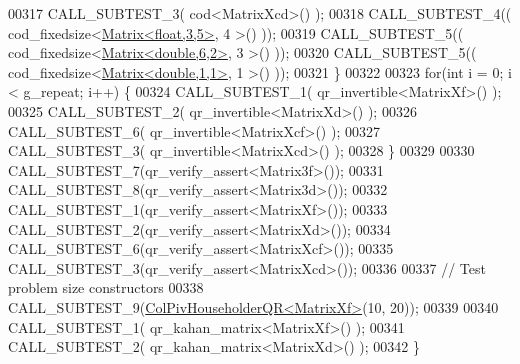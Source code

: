 \begin{DoxyCode}
00317     CALL\_SUBTEST\_3( cod<MatrixXcd>() );
00318     CALL\_SUBTEST\_4(( cod\_fixedsize<\hyperlink{group___core___module_class_eigen_1_1_matrix}{Matrix<float,3,5>}, 4 >() ));
00319     CALL\_SUBTEST\_5(( cod\_fixedsize<\hyperlink{group___core___module_class_eigen_1_1_matrix}{Matrix<double,6,2>}, 3 >() ));
00320     CALL\_SUBTEST\_5(( cod\_fixedsize<\hyperlink{group___core___module_class_eigen_1_1_matrix}{Matrix<double,1,1>}, 1 >() ));
00321   \}
00322 
00323   \textcolor{keywordflow}{for}(\textcolor{keywordtype}{int} i = 0; i < g\_repeat; i++) \{
00324     CALL\_SUBTEST\_1( qr\_invertible<MatrixXf>() );
00325     CALL\_SUBTEST\_2( qr\_invertible<MatrixXd>() );
00326     CALL\_SUBTEST\_6( qr\_invertible<MatrixXcf>() );
00327     CALL\_SUBTEST\_3( qr\_invertible<MatrixXcd>() );
00328   \}
00329 
00330   CALL\_SUBTEST\_7(qr\_verify\_assert<Matrix3f>());
00331   CALL\_SUBTEST\_8(qr\_verify\_assert<Matrix3d>());
00332   CALL\_SUBTEST\_1(qr\_verify\_assert<MatrixXf>());
00333   CALL\_SUBTEST\_2(qr\_verify\_assert<MatrixXd>());
00334   CALL\_SUBTEST\_6(qr\_verify\_assert<MatrixXcf>());
00335   CALL\_SUBTEST\_3(qr\_verify\_assert<MatrixXcd>());
00336 
00337   \textcolor{comment}{// Test problem size constructors}
00338   CALL\_SUBTEST\_9(\hyperlink{group___q_r___module_class_eigen_1_1_col_piv_householder_q_r}{ColPivHouseholderQR<MatrixXf>}(10, 20));
00339 
00340   CALL\_SUBTEST\_1( qr\_kahan\_matrix<MatrixXf>() );
00341   CALL\_SUBTEST\_2( qr\_kahan\_matrix<MatrixXd>() );
00342 \}
\end{DoxyCode}

